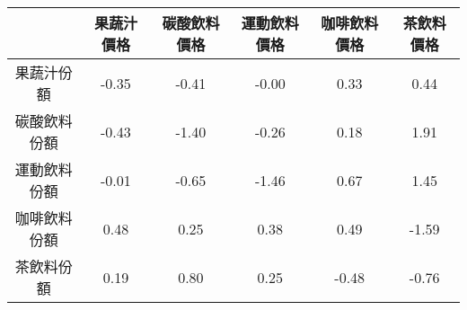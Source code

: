 \begin{tabular}{cccccc}
  \hline
 & 果蔬汁價格 & 碳酸飲料價格 & 運動飲料價格 & 咖啡飲料價格 & 茶飲料價格 \\ 
  \hline
果蔬汁份額 & -0.35 & -0.41 & -0.00 & 0.33 & 0.44 \\ 
  碳酸飲料份額 & -0.43 & -1.40 & -0.26 & 0.18 & 1.91 \\ 
  運動飲料份額 & -0.01 & -0.65 & -1.46 & 0.67 & 1.45 \\ 
  咖啡飲料份額 & 0.48 & 0.25 & 0.38 & 0.49 & -1.59 \\ 
  茶飲料份額 & 0.19 & 0.80 & 0.25 & -0.48 & -0.76 \\ 
   \hline
\end{tabular}
